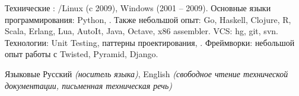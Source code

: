 \documentclass[unicode, 10pt, a4paper, oneside, fleqn]{article}
\begin{document}



\inlineheadsection  %
    {Технические}
    {
        : /Linux (c 2009), Windows (2001 -- 2009).
        Основные языки программирования: Python, .
        Также небольшой опыт: Go, Haskell, Clojure, R, Scala, Erlang, Lua,
        AutoIt, Java, Octave, x86 assembler.
        VCS: hg, git, svn.
        Технологии: Unit Testing, паттерны проектирования, .
        Фреймворки: небольшой опыт работы с Twisted, Pyramid, Django.
    }

\inlineheadsection
    {Языковые}
    {
        Русский \emph{(носитель языка)}, English \emph{(свободное чтение
        технической документации, письменная техническая речь)}
    }

\end{document}
